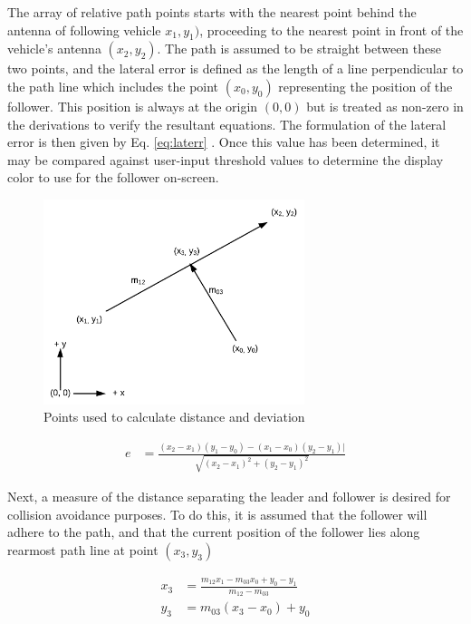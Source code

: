 \documentclass[12pt]{report}
\begin{document}
The array of relative path points starts with the nearest point behind the antenna of following vehicle $x_1,y_1)$, proceeding to the nearest point in front of the vehicle's antenna $(x_2,y_2)$. The path is assumed to be straight between these two points, and the lateral error is defined as the length of a line perpendicular to the path line which includes the point $(x_0,y_0)$ representing the position of the follower. This position is always at the origin $(0,0)$ but is treated as non-zero in the derivations to verify the resultant equations. The formulation of the lateral error is then given by Eq. \ref{eq:laterr} \cite{laterrformula}. Once this value has been determined, it may be compared against user-input threshold values to determine the display color to use for the follower on-screen.

\begin{figure}[ht] \label{fig:pathpts} \centering
    \includegraphics[width=3in]{./figs/path_points.png}
    \caption{Points used to calculate distance and deviation}
\end{figure}

\begin{align} \label{eq:laterr}
    e &= \frac{ (x_2 - x_1)(y_1 - y_0) - (x_1 - x_0)(y_2 - y_1) |} { \sqrt{ (x_2 - x_1)^2 + (y_2 - y_1)^2 } }
\end{align}

Next, a measure of the distance separating the leader and follower is desired for collision avoidance purposes. To do this, it is assumed that the follower will adhere to the path, and that the current position of the follower lies along rearmost path line at point $(x_3, y_3)$

\begin{align} \label{eq:devproj}
    x_3 &= \frac{ m_{12} x_1 - m_{03} x_0 + y_0 - y_1 } { m_{12} - m_{03} } \\
    y_3 &= m_{03} (x_3 - x_0) + y_0
\end{align}
\end{document}

